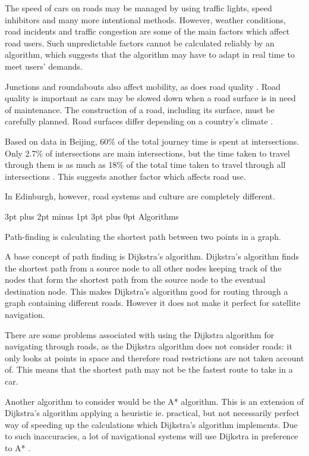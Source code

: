 \documentclass[12pt,a4paper]{article}
\makeatletter
\renewcommand\subsection{\@startsection {subsection}{1}{0mm} %
                               {3pt plus 2pt minus 1pt} %
                               {3pt plus 0pt} %
                               {\normalfont\bfseries}}
\makeatother
\begin{document}
The speed of cars on roads may be managed by using traffic lights, speed inhibitors and many more intentional methods. However, weather conditions, road incidents and traffic congestion are some of the main factors which affect road users. Such unpredictable factors cannot be calculated reliably by an algorithm, which suggests that the algorithm may have to adapt in real time to meet users’ demands.

Junctions and roundabouts also affect mobility, as does road quality \cite{Mathew2007}. Road quality is important as cars may be slowed down when a road surface is in need of maintenance. The construction of a road, including its surface, must be carefully planned. Road surfaces differ depending on a country's climate \cite{Mathew2007}. 

Based on data in Beijing, 60\% of the total journey time is spent at intersections. Only 2.7\% of intersections are main intersections, but the time taken to travel through them is as much as 18\% of the total time taken to travel through all intersections \cite{Liu}. This suggests another factor which affects road use. 

In Edinburgh, however, road systems and culture are completely different.

\subsection{Algorithms}

Path-finding is calculating the shortest path between two points in a graph.

A base concept of path finding is Dijkstra's algorithm. Dijkstra's algorithm finds the shortest path from a source node to all other nodes keeping track of the nodes that form the shortest path from the source node to the eventual destination node. This makes Dijkstra's algorithm good for routing through a graph containing different roads. However it does not make it perfect for satellite navigation.

There are some problems associated with using the Dijkstra algorithm for navigating through roads, as the Dijkstra algorithm does not consider roads: it only looks at points in space and therefore road restrictions are not taken account of. This means that the shortest path may not be the fastest route to take in a car.

Another algorithm to consider would be the A* algorithm. This is an extension of Dijkstra's algorithm applying a heuristic ie. practical, but not necessarily perfect way of speeding up the calculations which Dijkstra's algorithm implements. Due to such inaccuracies, a lot of navigational systems will use Dijkstra in preference to A* \cite{Zheng2018}. 
\end{document}
